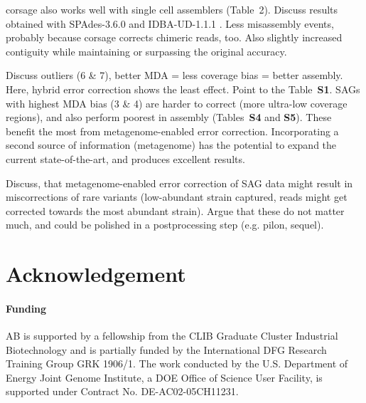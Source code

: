 \documentclass{bioinfo}
\begin{document}
corsage also works well with single cell assemblers (Table~2).
Discuss results obtained with SPAdes-3.6.0 \citep{spades1} and IDBA-UD-1.1.1 \citep{idba_ud}. Less misassembly events, probably because corsage corrects chimeric reads, too. Also slightly increased contiguity while maintaining or surpassing the original accuracy.

Discuss outliers (6 \& 7), better MDA = less coverage bias = better assembly. Here, hybrid error correction shows the least effect.
Point to the Table~\textbf{S1}.
SAGs with highest MDA bias (3 \& 4) are harder to correct (more ultra-low coverage regions), and also perform poorest in assembly (Tables~\textbf{S4} and \textbf{S5}). These benefit the most from metagenome-enabled error correction.
Incorporating a second source of information (metagenome) has the potential to expand the current state-of-the-art, and produces excellent results.

Discuss, that metagenome-enabled error correction of SAG data might result in miscorrections of rare variants (low-abundant strain captured, reads might get corrected towards the most abundant strain).
Argue that these do not matter much, and could be polished in a postprocessing step (e.g. pilon, sequel).

\section*{Acknowledgement}
\paragraph{Funding\textcolon}
AB is supported by a fellowship from the CLIB Graduate Cluster Industrial Biotechnology and is partially funded by the International DFG Research Training Group GRK 1906/1.
The work conducted by the U.S. Department of Energy Joint Genome Institute, a DOE Office of Science User Facility, is supported under Contract No. DE-AC02-05CH11231.



\newpage

\end{document}
